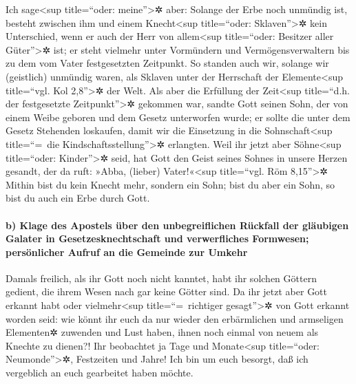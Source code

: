  Ich sage\textless sup title=``oder: meine''\textgreater✲
aber: Solange der Erbe noch unmündig ist, besteht zwischen ihm und einem
Knecht\textless sup title=``oder: Sklaven''\textgreater✲ kein
Unterschied, wenn er auch der Herr von allem\textless sup title=``oder:
Besitzer aller Güter''\textgreater✲ ist;  er steht
vielmehr unter Vormündern und Vermögensverwaltern bis zu dem vom Vater
festgesetzten Zeitpunkt.  So standen auch wir, solange wir
(geistlich) unmündig waren, als Sklaven unter der Herrschaft der
Elemente\textless sup title=``vgl. Kol 2,8''\textgreater✲ der Welt.
 Als aber die Erfüllung der Zeit\textless sup title=``d.h.
der festgesetzte Zeitpunkt''\textgreater✲ gekommen war, sandte Gott
seinen Sohn, der von einem Weibe geboren und dem Gesetz unterworfen
wurde;  er sollte die unter dem Gesetz Stehenden
loskaufen, damit wir die Einsetzung in die Sohnschaft\textless sup
title=``=~die Kindschaftsstellung''\textgreater✲ erlangten.
 Weil ihr jetzt aber Söhne\textless sup title=``oder:
Kinder''\textgreater✲ seid, hat Gott den Geist seines Sohnes in unsere
Herzen gesandt, der da ruft: »Abba, (lieber) Vater!«\textless sup
title=``vgl. Röm 8,15''\textgreater✲  Mithin bist du kein
Knecht mehr, sondern ein Sohn; bist du aber ein Sohn, so bist du auch
ein Erbe durch Gott.

\hypertarget{b-klage-des-apostels-uxfcber-den-unbegreiflichen-ruxfcckfall-der-gluxe4ubigen-galater-in-gesetzesknechtschaft-und-verwerfliches-formwesen-persuxf6nlicher-aufruf-an-die-gemeinde-zur-umkehr}{%
\paragraph{b) Klage des Apostels über den unbegreiflichen Rückfall der
gläubigen Galater in Gesetzesknechtschaft und verwerfliches Formwesen;
persönlicher Aufruf an die Gemeinde zur
Umkehr}\label{b-klage-des-apostels-uxfcber-den-unbegreiflichen-ruxfcckfall-der-gluxe4ubigen-galater-in-gesetzesknechtschaft-und-verwerfliches-formwesen-persuxf6nlicher-aufruf-an-die-gemeinde-zur-umkehr}}

 Damals freilich, als ihr Gott noch nicht kanntet, habt
ihr solchen Göttern gedient, die ihrem Wesen nach gar keine Götter sind.
 Da ihr jetzt aber Gott erkannt habt oder
vielmehr\textless sup title=``=~richtiger gesagt''\textgreater✲ von Gott
erkannt worden seid: wie könnt ihr euch da nur wieder den erbärmlichen
und armseligen Elementen✲ zuwenden und Lust haben, ihnen noch einmal von
neuem als Knechte zu dienen?!  Ihr beobachtet ja Tage und
Monate\textless sup title=``oder: Neumonde''\textgreater✲, Festzeiten
und Jahre!  Ich bin um euch besorgt, daß ich vergeblich
an euch gearbeitet haben möchte.


